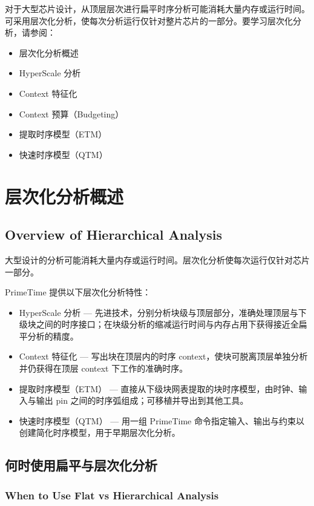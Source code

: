 \label{chap:hier}

对于大型芯片设计，从顶层层次进行扁平时序分析可能消耗大量内存或运行时间。可采用层次化分析，使每次分析运行仅针对整片芯片的一部分。要学习层次化分析，请参阅：
\begin{itemize}
  \item 层次化分析概述
  \item HyperScale 分析
  \item Context 特征化
  \item Context 预算（Budgeting）
  \item 提取时序模型（ETM）
  \item 快速时序模型（QTM）
\end{itemize}

\section{层次化分析概述}
\subsection*{Overview of Hierarchical Analysis}

大型设计的分析可能消耗大量内存或运行时间。层次化分析使每次运行仅针对芯片一部分。

PrimeTime 提供以下层次化分析特性：
\begin{itemize}
  \item HyperScale 分析 — 先进技术，分别分析块级与顶层部分，准确处理顶层与下级块之间的时序接口；在块级分析的缩减运行时间与内存占用下获得接近全扁平分析的精度。
  \item Context 特征化 — 写出块在顶层内的时序 context，使块可脱离顶层单独分析并仍获得在顶层 context 下工作的准确时序。
  \item 提取时序模型（ETM） — 直接从下级块网表提取的块时序模型，由时钟、输入与输出 pin 之间的时序弧组成；可移植并导出到其他工具。
  \item 快速时序模型（QTM） — 用一组 PrimeTime 命令指定输入、输出与约束以创建简化时序模型，用于早期层次化分析。
\end{itemize}


\subsection{何时使用扁平与层次化分析}
\subsubsection*{When to Use Flat vs Hierarchical Analysis}

